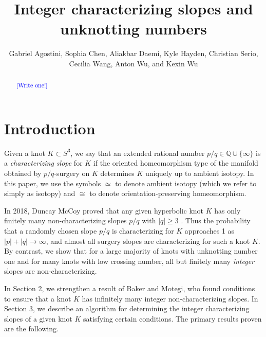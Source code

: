 \documentclass[11pt,usenames,dvipsnames,reqno]{amsart}
\numberwithin{theorem}{section}
\theoremstyle{ex}
\theoremstyle{rem}
\def\kh#1{\textcolor{Blue}{#1}}
\begin{document}


\title{Integer characterizing slopes and unknotting numbers}

\author[Agostini, Chen, Daemi, Hayden, Serio, Wang, A. Wu, and K. Wu]{Gabriel Agostini, Sophia Chen, Aliakbar Daemi, Kyle Hayden, Christian Serio, Cecilia Wang, Anton Wu, and Kexin Wu}



\begin{abstract} 
\kh{[Write one!]}
\end{abstract}


\maketitle

\section{Introduction}\label{sec:intro}

Given a knot $K\subset S^3$, we say that an extended rational number $p/q\in\mathbb{Q}\cup\{\infty\}$ is a {\it characterizing slope} for $K$ if the oriented homeomorphism type of the manifold obtained by $p/q$-surgery on $K$ determines $K$ uniquely up to ambient isotopy. In this paper, we use the symbols $\simeq$ to denote ambient isotopy (which we refer to simply as isotopy) and $\cong$ to denote orientation-preserving homeomorphism. 

In 2018, Duncay McCoy proved that any given hyperbolic knot $K$ has only finitely many non-characterizing slopes $p/q$ with $|q|\geq 3$ \cite{mccoy:hyperbolic}. Thus the probability that a randomly chosen slope $p/q$ is characterizing for $K$ approaches 1 as $|p|+|q|\to\infty$, and almost all surgery slopes are characterizing for such a knot $K$. By contrast, we show that for a large majority of knots with unknotting number one and for many knots with low crossing number, all but finitely many \textit{integer} slopes are non-characterizing.

In Section 2, we strengthen a result of Baker and Motegi, who found conditions to ensure that a knot $K$ has infinitely many integer non-characterizing slopes. In Section 3, we describe an algorithm for determining the integer characterizing slopes of a given knot $K$ satisfying certain conditions. The primary results proven are the following.
\end{document}

